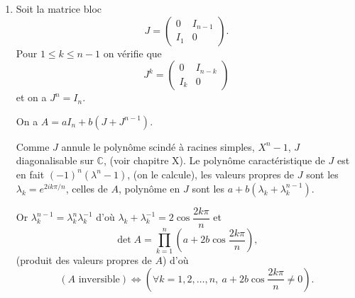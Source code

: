 \begin{enumerate}[label=\arabic*.,leftmargin=2.2em,itemsep=1.2em]
Mais alors $X'$ commute avec $M'$ si et seulement si $P^{-1}X'P=X''$ commute avec $M''$. Les sous-espaces propres de $M''$ doivent donc être stables par $X''$ qui est du type
\[
X''=\begin{pmatrix}\alpha&\beta&0\\\gamma&\delta&0\\0&0&\varepsilon\end{pmatrix}
\]
et on vérifie que pour ces $X''$ on a bien $X''M''=M''X''$.

Les $X'$ cherchées sont donc les matrices
\[
X'=P\begin{pmatrix}\alpha&\beta&0\\\gamma&\delta&0\\0&0&\varepsilon\end{pmatrix}P^{-1}
\]
et on trouve les
\[
X'=\begin{pmatrix}
\alpha&2\beta&\beta\\
\gamma&2\delta-\varepsilon&\delta-\varepsilon\\
-\gamma&-2\delta+2\varepsilon&-\delta+2\varepsilon
\end{pmatrix}.
\]
On a . Cette fois c'est un espace vectoriel de dimension 5.

\item Soit la matrice bloc
\[
J=\begin{pmatrix}0&I_{n-1}\\ I_1&0\end{pmatrix}.
\]
Pour $1\le k\le n-1$ on vérifie que
\[
J^k=\begin{pmatrix}0&I_{n-k}\\ I_k&0\end{pmatrix}
\]
et on a $J^n=I_n$.

On a $A=aI_n+b(J+J^{n-1})$.

Comme $J$ annule le polynôme scindé à racines simples, $X^n-1$, $J$ diagonalisable sur $\mathbb C$, (voir chapitre X). Le polynôme caractéristique de $J$ est en fait $(-1)^n(\lambda^n-1)$, (on le calcule), les valeurs propres de $J$ sont les $\lambda_k=e^{2ik\pi/n}$, celles de $A$, polynôme en $J$ sont les $a+b(\lambda_k+\lambda_k^{n-1})$.

Or $\lambda_k^{n-1}=\lambda_k^n\lambda_k^{-1}$ d'où $\lambda_k+\lambda_k^{-1}=2\cos\dfrac{2k\pi}{n}$ et
\[
\det A=\prod_{k=1}^n\left(a+2b\cos\frac{2k\pi}{n}\right),
\]
(produit des valeurs propres de $A$) d'où
\[
(A\text{ inversible})\Longleftrightarrow
\left(\forall k=1,2,\ldots,n,\ a+2b\cos\frac{2k\pi}{n}\ne0\right).
\]


\end{enumerate}
